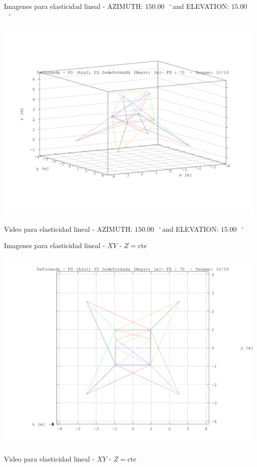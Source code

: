 \documentclass[a4paper,11pt]{article}
\newcommand{\grad}{\hspace{-2.5mm}$\,\phantom{a}^{\circ}\,$}
\begin{document}
\newpage       

\newpage       
\begin{center}       
Imagenes para elasticidad lineal - AZIMUTH: $150.00$\grad and ELEVATION: $ 15.00$\grad

\includegraphics[width=.80\textwidth]{../torre_deformada_10.png}      

Video para elasticidad lineal - AZIMUTH: $150.00$\grad and ELEVATION: $ 15.00$\grad


\end{center}       
\newpage       
\begin{center}       
Imagenes para elasticidad lineal -  $XY$ - $Z=\text{cte}$ 

\includegraphics[width=.80\textwidth]{../../XY_XZ_YZ/XY/deformada/torre_deformada_XY_10.png}      


Video para elasticidad lineal -  $XY$ - $Z=\text{cte}$ 


\end{center}       
\end{document}
